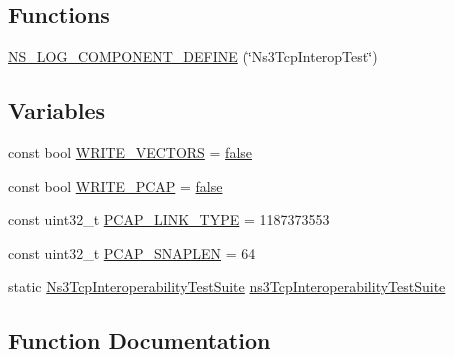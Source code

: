 \subsection*{Functions}
\begin{DoxyCompactItemize}
\item 
\hyperlink{ns3tcp-interop-test-suite_8cc_ab9fc3defc2e8ad2c4b68ad14ea36d406}{N\+S\+\_\+\+L\+O\+G\+\_\+\+C\+O\+M\+P\+O\+N\+E\+N\+T\+\_\+\+D\+E\+F\+I\+NE} (\char`\"{}Ns3\+Tcp\+Interop\+Test\char`\"{})
\end{DoxyCompactItemize}
\subsection*{Variables}
\begin{DoxyCompactItemize}
\item 
const bool \hyperlink{ns3tcp-interop-test-suite_8cc_a6829179e1fbdbc03f407d65a63c07153}{W\+R\+I\+T\+E\+\_\+\+V\+E\+C\+T\+O\+RS} = \hyperlink{lte__cqi__generation_8m_ab1bef239d413c4da139c4bac92cd657a}{false}
\item 
const bool \hyperlink{ns3tcp-interop-test-suite_8cc_a9ba71edaadfde927e9912e6b37a37f39}{W\+R\+I\+T\+E\+\_\+\+P\+C\+AP} = \hyperlink{lte__cqi__generation_8m_ab1bef239d413c4da139c4bac92cd657a}{false}
\item 
const uint32\+\_\+t \hyperlink{ns3tcp-interop-test-suite_8cc_a1d33ea10cde9143eb9b36be021f3739e}{P\+C\+A\+P\+\_\+\+L\+I\+N\+K\+\_\+\+T\+Y\+PE} = 1187373553
\item 
const uint32\+\_\+t \hyperlink{ns3tcp-interop-test-suite_8cc_ae9a6b49b98d0c7917dda456f6771d2e1}{P\+C\+A\+P\+\_\+\+S\+N\+A\+P\+L\+EN} = 64
\item 
static \hyperlink{classNs3TcpInteroperabilityTestSuite}{Ns3\+Tcp\+Interoperability\+Test\+Suite} \hyperlink{ns3tcp-interop-test-suite_8cc_aef8263fb801d27c866b2e966e46d6614}{ns3\+Tcp\+Interoperability\+Test\+Suite}
\end{DoxyCompactItemize}


\subsection{Function Documentation}
